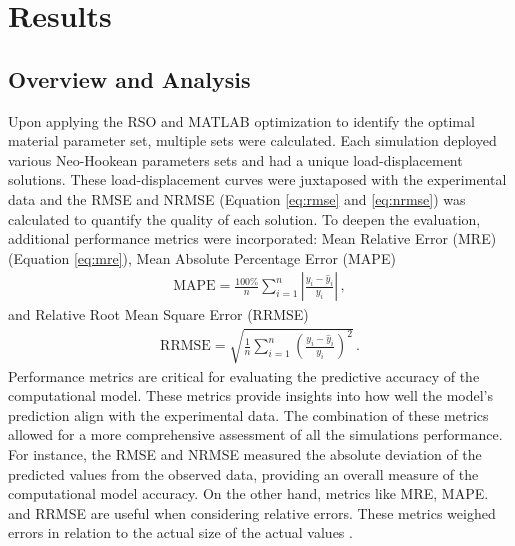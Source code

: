 
\chapter{Results} %
\label{chapter:results} %

\section{Overview and Analysis}
Upon applying the RSO and MATLAB optimization to identify the optimal material parameter set, 
multiple sets were calculated. 
Each simulation deployed various Neo-Hookean parameters sets and 
had a unique load-displacement solutions. These load-displacement curves were 
juxtaposed with the experimental data and the RMSE and NRMSE (Equation \ref{eq:rmse} and \ref{eq:nrmse}) was calculated to quantify the quality 
of each solution. To deepen the evaluation, additional performance metrics were incorporated: 
Mean Relative Error (MRE) (Equation \ref{eq:mre}), Mean Absolute Percentage Error (MAPE)
\begin{align}
    \text{MAPE} = \frac{100\%}{n} \sum_{i=1}^{n} \left| \frac{y_i - \hat{y}_i}{y_i} \right| \,,
\end{align}
and  Relative Root Mean Square Error (RRMSE)  
\begin{align}
    \text{RRMSE} = \sqrt{\frac{1}{n} \sum_{i=1}^{n} \left( \frac{y_i - \hat{y}_i}{y_i} \right)^2} \,.
\end{align}
Performance metrics are critical for evaluating the predictive accuracy of the computational model.
These metrics provide insights into how well the model's prediction align with the 
experimental data. The combination of these metrics allowed for a more comprehensive 
assessment of all the simulations performance. For instance, the RMSE and NRMSE measured the
absolute deviation of the predicted values from the observed data, providing an overall 
measure of the computational model accuracy. On the other hand, metrics like MRE, MAPE. and 
RRMSE are useful when considering relative errors. These metrics weighed errors in relation
to the actual size of the actual values \cite{Rajagukguk2020}.\\

